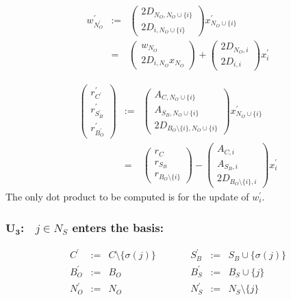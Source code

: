 \documentclass[a4paper]{article}
\begin{document}
\begin{eqnarray}
w_{N_{O}^{\prime}}^{\prime}
&:=&
\left(
\begin{array}{c}
2D_{N_{O}, N_{O} \cup \{i\}} \\
\hline
2D_{i, N_{O} \cup \{i\}}
\end{array}
\right)
x_{N_{O} \cup \{i\}}^{\prime}
\nonumber \\
&=&
\left(
\begin{array}{c}
w_{N_{O}} \\
\hline
2D_{i, N_{O}}x_{N_{O}}
\end{array}
\right)
+
\left(
\begin{array}{c}
2D_{N_{O}, i} \\
\hline
2D_{i, i}
\end{array}
\right)
x_{i}^{\prime}
\end{eqnarray}

\begin{eqnarray}
\left(
\begin{array}{c}
r_{C^{\prime}}^{\prime} \\
\hline
r_{S_{B}^{\prime}}^{\prime} \\
\hline
r_{B_{O}^{\prime}}^{\prime}
\end{array}
\right)
&:=&
\left(
\begin{array}{c}
A_{C, N_{O} \cup \{i\}} \\
\hline
A_{S_{B}, N_{O} \cup \{i\}} \\
\hline
2D_{B_{O} \setminus \{i\}, N_{O} \cup \{i\}} 
\end{array}
\right)
x_{N_{O} \cup \{i\}}^{\prime}
\nonumber \\
&=&
\left(
\begin{array}{c}
r_{C} \\
\hline
r_{S_{B}} \\
\hline
r_{B_{O} \setminus \{i\}}
\end{array}
\right)
-
\left(
\begin{array}{c}
A_{C, i} \\
\hline
A_{S_{B}, i} \\
\hline
2D_{B_{O} \setminus \{i\}, i}
\end{array}
\right)
x_{i}^{\prime}
\end{eqnarray}
The only dot product to be computed is for the update of $w_{i}^{\prime}$.

\subsubsection{$\mathbf{U_{3}}$:$\quad j \in N_{S}$ enters the basis:}
\begin{equation}
\label{update:slack_enters_basis}
\begin{array}{ccccccc}
C^{\prime}      &:=&  C \setminus \{\sigma(j)\}
&\quad\quad&
S_{B}^{\prime}  &:=&  S_{B} \cup \{\sigma(j)\}  \\
B_{O}^{\prime}  &:=&  B_{O}
&\quad\quad&
B_{S}^{\prime}  &:=&  B_{S} \cup \{j\}  \\
N_{O}^{\prime}  &:=&  N_{O}
&\quad\quad&
N_{S}^{\prime}  &:=&  N_{S} \setminus \{j\} 
\end{array}
\end{equation}
\end{document}
